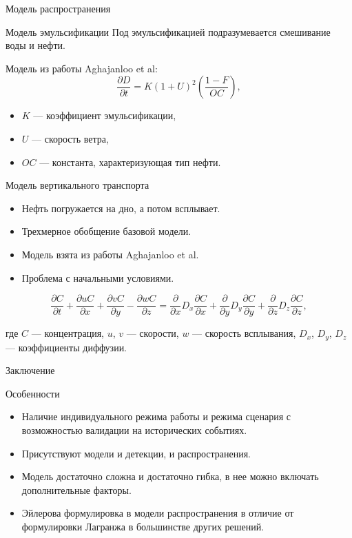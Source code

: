 \documentclass{beamer}
\begin{document}
\begin{section}{Модель распространения}
\begin{frame}{Модель эмульсификации}
Под эмульсификацией подразумевается смешивание воды и нефти.

Модель из работы Aghajanloo et al:
$$\frac{\partial D}{\partial t} = K \left(1 + U\right)^2\left(\frac{1 - F}{OC}\right),$$
\begin{itemize}
	\item $K$ --- коэффициент эмульсификации, 
	\item $U$ --- скорость ветра,
	\item $OC$ --- константа, характеризующая тип нефти.
\end{itemize}
\end{frame}

\begin{frame}{Модель вертикального транспорта}
\begin{itemize}
	\item Нефть погружается на дно, а потом всплывает.
	\item Трехмерное обобщение базовой модели.
	\item Модель взята из работы Aghajanloo et al.
	\item Проблема с начальными условиями.
\end{itemize}

$$\frac{\partial C}{\partial t} + \frac{\partial u C}{\partial x} + \frac{\partial v C}{\partial y} - \frac{\partial w C}{\partial z} = \frac{\partial}{\partial x}D_x\frac{\partial C}{\partial x} + \frac{\partial}{\partial y}D_y\frac{\partial C}{\partial y} + \frac{\partial}{\partial z}D_z\frac{\partial C}{\partial z},$$

где $C$ --- концентрация, $u$, $v$ --- скорости, $w$ --- скорость всплывания, $D_x$, $D_y$, $D_z$ --- коэффициенты диффузии.
\end{frame}

\end{section}

\begin{section}{Заключение}

\begin{frame}{Особенности}
	\begin{itemize}
		\item Наличие индивидуального режима работы и режима сценария с возможностью валидации на исторических событиях.
		\item Присутствуют модели и детекции, и распространения.
		\item Модель достаточно сложна и достаточно гибка, в нее можно включать дополнительные факторы.
		\item Эйлерова формулировка в модели распространения в отличие от формулировки Лагранжа в большинстве других решений.		
	\end{itemize}
\end{frame}

\end{section}
\end{document}
